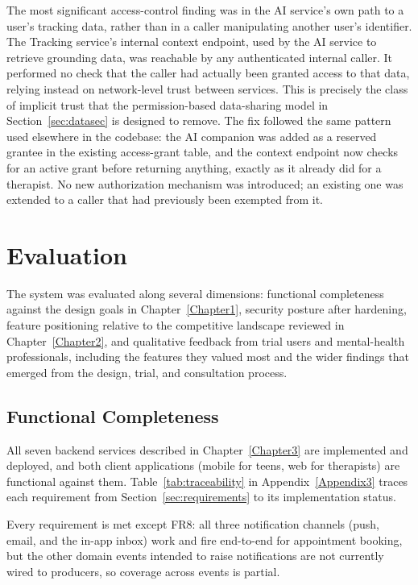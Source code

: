 The most significant access-control finding was in the AI service's own path to a user's tracking data, rather than in a caller manipulating another user's identifier. The Tracking service's internal context endpoint, used by the AI service to retrieve grounding data, was reachable by any authenticated internal caller. It performed no check that the caller had actually been granted access to that data, relying instead on network-level trust between services. This is precisely the class of implicit trust that the permission-based data-sharing model in Section~\ref{sec:datasec} is designed to remove. The fix followed the same pattern used elsewhere in the codebase: the AI companion was added as a reserved grantee in the existing access-grant table, and the context endpoint now checks for an active grant before returning anything, exactly as it already did for a therapist. No new authorization mechanism was introduced; an existing one was extended to a caller that had previously been exempted from it.

\section{Evaluation}

The system was evaluated along several dimensions: functional completeness against the design goals in Chapter~\ref{Chapter1}, security posture after hardening, feature positioning relative to the competitive landscape reviewed in Chapter~\ref{Chapter2}, and qualitative feedback from trial users and mental-health professionals, including the features they valued most and the wider findings that emerged from the design, trial, and consultation process.

\subsection{Functional Completeness}
\label{sec:functional-completeness}

All seven backend services described in Chapter~\ref{Chapter3} are implemented and deployed, and both client applications (mobile for teens, web for therapists) are functional against them. Table~\ref{tab:traceability} in Appendix~\ref{Appendix3} traces each requirement from Section~\ref{sec:requirements} to its implementation status.

Every requirement is met except FR8: all three notification channels (push, email, and the in-app inbox) work and fire end-to-end for appointment booking, but the other domain events intended to raise notifications are not currently wired to producers, so coverage across events is partial.

